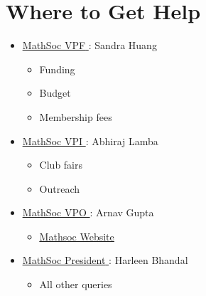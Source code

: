 \documentclass[utf8]{article}
\makeatletter
\newcommand{\MathSocVPF}{\href{mailto:vpf@mathsoc.uwaterloo.ca}{\underline{MathSoc VPF} }}
\newcommand{\MathSocVPI}{\href{mailto:vpi@mathsoc.uwaterloo.ca}{\underline{MathSoc VPI} }}
\newcommand{\MathSocVPO}{\href{mailto:vpo@mathsoc.uwaterloo.ca}{\underline{MathSoc VPO} }}
\newcommand{\MathSocPrez}{\href{mailto:prez@mathsoc.uwaterloo.ca}{\underline{MathSoc President} }}
\newcommand{\MathSocVPFName}{Sandra Huang}
\newcommand{\MathSocVPIName}{Abhiraj Lamba}
\newcommand{\MathSocVPOName}{Arnav Gupta}
\newcommand{\MathSocPrezName}{Harleen Bhandal}
\newcommand{\mathsocsite}{\href{https://mathsoc.uwaterloo.ca/}{\underline{Mathsoc Website}}}
\makeatother
\begin{document}
\section*{Where to Get Help}
\begin{itemize}
    \item \MathSocVPF : \MathSocVPFName
    \begin{itemize}
        \item Funding
        \item Budget
        \item Membership fees
    \end{itemize}
    \item \MathSocVPI : \MathSocVPIName
    \begin{itemize}
        \item Club fairs
        \item Outreach
    \end{itemize}
    \item \MathSocVPO : \MathSocVPOName
    \begin{itemize}
        \item \mathsocsite
    \end{itemize}
    \item \MathSocPrez : \MathSocPrezName
    \begin{itemize}
        \item All other queries
    \end{itemize}
\end{itemize}
\end{document}
